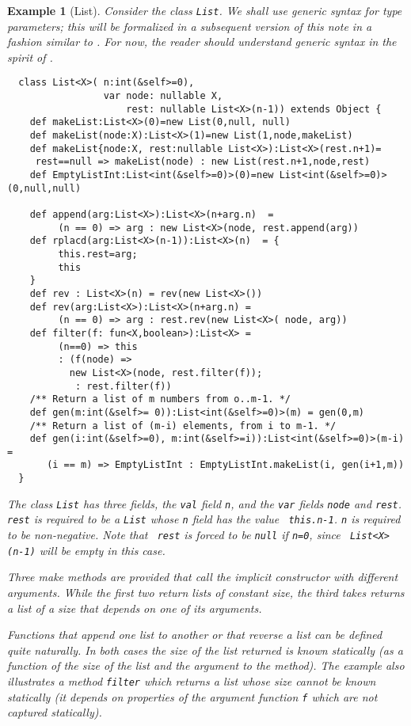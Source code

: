 \documentclass[nocopyrightspace,preprint,10pt]{sigplanconf}
\newtheorem{example}{Example}[section]
\begin{document}
\begin{example}[List]\label{List}
Consider the class {\tt List}. We shall use generic syntax for
type parameters; this will be formalized in a subsequent version 
of this note in a fashion similar to \cite{FJ}. For now, 
the reader should understand generic syntax in the spirit of \cite{FJ}.

{\footnotesize
\begin{verbatim}
  class List<X>( n:int(&self>=0), 
                 var node: nullable X, 
                     rest: nullable List<X>(n-1)) extends Object {
    def makeList:List<X>(0)=new List(0,null, null)
    def makeList(node:X):List<X>(1)=new List(1,node,makeList)
    def makeList{node:X, rest:nullable List<X>):List<X>(rest.n+1)=
     rest==null => makeList(node) : new List(rest.n+1,node,rest)
    def EmptyListInt:List<int(&self>=0)>(0)=new List<int(&self>=0)>(0,null,null)

    def append(arg:List<X>):List<X>(n+arg.n)  =
         (n == 0) => arg : new List<X>(node, rest.append(arg))
    def rplacd(arg:List<X>(n-1)):List<X>(n)  = {
         this.rest=arg;
         this
    }
    def rev : List<X>(n) = rev(new List<X>())
    def rev(arg:List<X>):List<X>(n+arg.n) = 
         (n == 0) => arg : rest.rev(new List<X>( node, arg))
    def filter(f: fun<X,boolean>):List<X> = 
         (n==0) => this
         : (f(node) => 
           new List<X>(node, rest.filter(f));
            : rest.filter(f))
    /** Return a list of m numbers from o..m-1. */
    def gen(m:int(&self>= 0)):List<int(&self>=0)>(m) = gen(0,m)
    /** Return a list of (m-i) elements, from i to m-1. */
    def gen(i:int(&self>=0), m:int(&self>=i)):List<int(&self>=0)>(m-i) = 
       (i == m) => EmptyListInt : EmptyListInt.makeList(i, gen(i+1,m))
  }  
\end{verbatim}}

The class {\tt List} has three fields, the {\tt val} field {\tt n},
and the {\tt var} fields {\tt node} and {\tt rest}. {\tt rest} is
required to be a {\tt List} whose {\tt n} field has the value {\tt
this.n-1}.  {\tt n} is required to be non-negative. Note that {\tt
rest} is forced to be {\tt null} if {\tt n=0}, since {\tt
List<X>(n-1)} will be empty in this case.

Three make methods are provided that call the implicit constructor
with different arguments. While the first two return lists of
constant size, the third takes  returns a list of a size
that depends on one of its arguments. 

Functions that append one list to another or that reverse a list can
be defined quite naturally. In both cases the size of the
list returned is known statically (as a function of the size of the
list and the argument to the method).  The example also illustrates a
method {\tt filter} which returns a list whose size cannot be known
statically (it depends on properties of the argument function {\tt f}
which are not captured statically).


\end{example}
\end{document}
